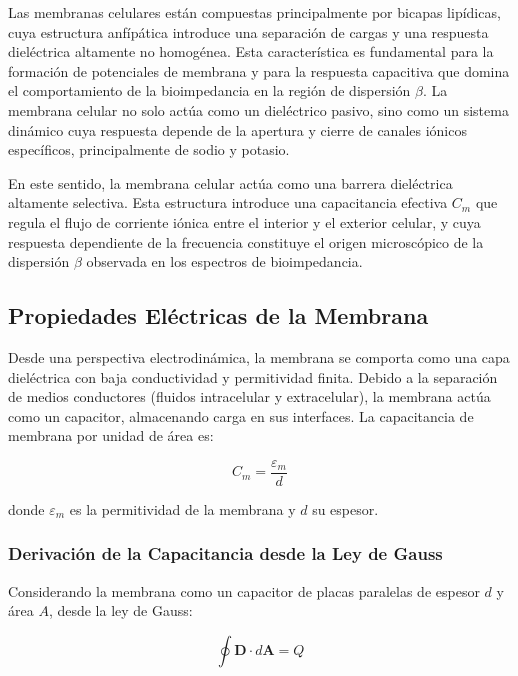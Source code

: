 \documentclass[12pt]{article}
\begin{document}
Las membranas celulares est\'an compuestas principalmente por bicapas lip\'idicas,
cuya estructura anf\'ip\'atica introduce una separaci\'on de cargas y una respuesta
diel\'ectrica altamente no homog\'enea. Esta caracter\'istica es fundamental para
la formaci\'on de potenciales de membrana y para la respuesta capacitiva que
domina el comportamiento de la bioimpedancia en la regi\'on de dispersi\'on $\beta$.
La membrana celular no solo act\'ua como un diel\'ectrico pasivo, sino como un
sistema din\'amico cuya respuesta depende de la apertura y cierre de canales
i\'onicos espec\'ificos, principalmente de sodio y potasio.

En este sentido, la membrana celular act\'ua como una barrera diel\'ectrica altamente selectiva.
Esta estructura introduce una capacitancia efectiva $C_m$ que regula el flujo de corriente i\'onica
entre el interior y el exterior celular, y cuya respuesta dependiente de la frecuencia constituye el
origen microsc\'opico de la dispersi\'on $\beta$ observada en los espectros de bioimpedancia.

\subsection{Propiedades El\'ectricas de la Membrana}

Desde una perspectiva electrodin\'amica, la membrana se comporta como una capa diel\'ectrica
con baja conductividad y permitividad finita. Debido a la separaci\'on de medios conductores
(fluidos intracelular y extracelular), la membrana act\'ua como un capacitor, almacenando
carga en sus interfaces. La capacitancia de membrana por unidad de \'area es:

\begin{equation}
C_m = \frac{\varepsilon_m}{d}
\end{equation}

donde $\varepsilon_m$ es la permitividad de la membrana y $d$ su espesor.

\subsubsection{Derivaci\'on de la Capacitancia desde la Ley de Gauss}

Considerando la membrana como un capacitor de placas paralelas de espesor $d$ y \'area $A$,
desde la ley de Gauss:

\begin{equation}
\oint \mathbf{D} \cdot d\mathbf{A} = Q
\end{equation}
\end{document}
